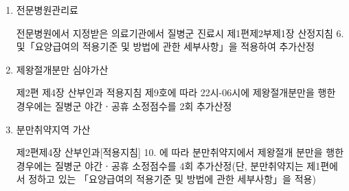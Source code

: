 \begin{enumerate}[가.]
\item 전문병원관리료\par
전문병원에서 지정받은 의료기관에서 질병군 진료시 제1편제2부제1장 산정지침 6. 및「요양급여의 적용기준 및 방법에 관한 세부사항」을 적용하여 추가산정
\item 제왕절개분만 심야가산\par
제2편 제4장 산부인과 적용지침 제9호에 따라 22시-06시에 제왕절개분만을 행한 경우에는 질병군 야간ㆍ공휴 소정점수를 2회 추가산정
\item 분만취약지역 가산\par
제2편제4장 산부인과[적용지침] 10. 에 따라 분만취약지에서 제왕절개 분만을 행한 경우에는 질병군 야간ㆍ공휴 소정점수를 4회 추가산정(단, 분만취약지는 제1편에서 정하고 있는 「요양급여의 적용기준 및 방법에 관한 세부사항」을 적용)
\end{enumerate}